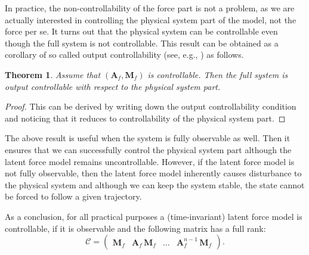 \documentclass[journal]{IEEEtran}
\newtheorem{theorem}{Theorem}[section]
\begin{document}
In practice, the non-controllability of the force part is not a problem, as we are actually interested in controlling the physical system part of the model, not the force per se. It turns out that the physical system can be controllable even though the full system is not controllable. This result can be obtained as a corollary of so called output controllability (see, e.g., \cite{Ogata:1997}) as follows.

\begin{theorem} \label{the:stab}
Assume that $(\mathbf{A}_f,\mathbf{M}_f)$ is controllable. Then the full system is output controllable with respect to the physical system part.
\end{theorem}

\begin{proof}
This can be derived by writing down the output controllability condition \cite{Ogata:1997} and noticing that it reduces to controllability of the physical system part.
\end{proof}

The above result is useful when the system is fully observable as well. Then it ensures that we can successfully control
the physical system part although the latent force model remains uncontrollable. However, if the latent force model is
not fully observable, then the latent force model inherently causes disturbance to the physical system and although we can keep the system stable, the state cannot be forced to follow a given trajectory.

As a conclusion, for all practical purposes a (time-invariant) latent force model is controllable, if it is observable and the following matrix has a full rank:
%
\begin{equation}
  \mathcal{C} = \begin{pmatrix}
  	\mathbf{M}_f & \mathbf{A}_f \, \mathbf{M}_f & \hdots & \mathbf{A}_f^{n-1} \, \mathbf{M}_f
  \end{pmatrix}.
\end{equation}
\end{document}
